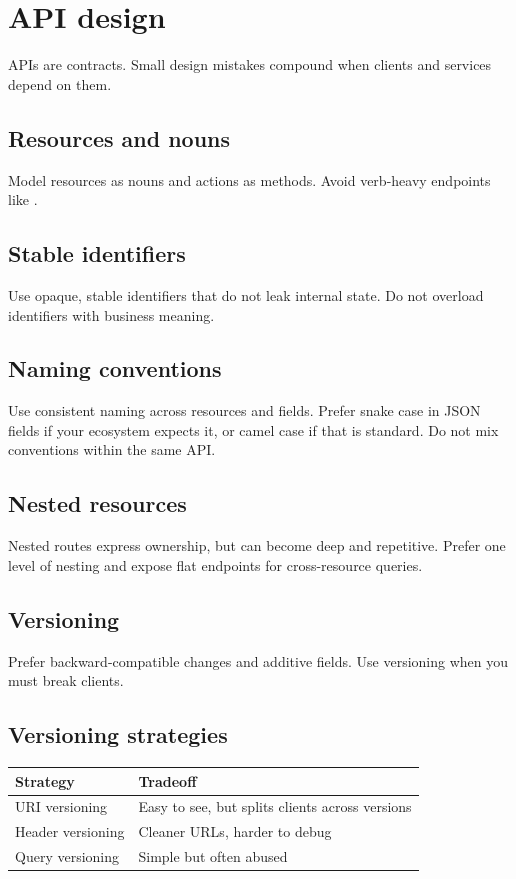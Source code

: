 \chapter{API design}

APIs are contracts.
Small design mistakes compound when clients and services depend on them.

\section{Resources and nouns}
Model resources as nouns and actions as methods.
Avoid verb-heavy endpoints like .

\section{Stable identifiers}
Use opaque, stable identifiers that do not leak internal state.
Do not overload identifiers with business meaning.

\section{Naming conventions}
Use consistent naming across resources and fields.
Prefer snake case in JSON fields if your ecosystem expects it, or camel case if that is standard.
Do not mix conventions within the same API.

\section{Nested resources}
Nested routes express ownership, but can become deep and repetitive.
Prefer one level of nesting and expose flat endpoints for cross-resource queries.

\section{Versioning}
Prefer backward-compatible changes and additive fields.
Use versioning when you must break clients.

\section{Versioning strategies}
\begin{tabularx}{\textwidth}{@{}lX@{}}
\toprule
Strategy & Tradeoff \\
\midrule
URI versioning & Easy to see, but splits clients across versions \\
Header versioning & Cleaner URLs, harder to debug \\
Query versioning & Simple but often abused \\
\bottomrule
\end{tabularx}

